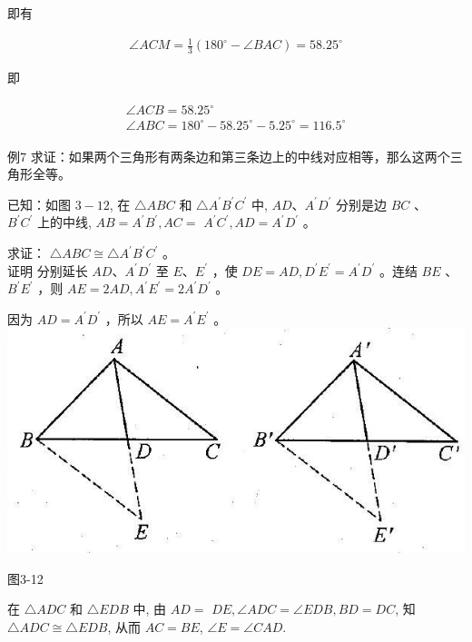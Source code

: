 \documentclass[10pt]{article}
\begin{document}
即有

\begin{align*}
\angle A C M=\frac{1}{3}\left(180^{\circ}-\angle B A C\right)=58.25^{\circ}
\end{align*}

即

\begin{align*}
\begin{gathered}
\angle A C B=58.25^{\circ} \\
\angle A B C=180^{\circ}-58.25^{\circ}-5.25^{\circ}=116.5^{\circ}
\end{gathered}
\end{align*}

例7 求证：如果两个三角形有两条边和第三条边上的中线对应相等，那么这两个三角形全等。

已知：如图 $3-12$, 在 $\triangle A B C$ 和 $\triangle A^{\prime} B^{\prime} C^{\prime}$ 中, $A D 、 A^{\prime} D^{\prime}$ 分别是边 $B C$ 、\\
$B^{\prime} C^{\prime}$ 上的中线, $A B=A^{\prime} B^{\prime}, A C=$ $A^{\prime} C^{\prime}, A D=A^{\prime} D^{\prime}$ 。

求证： $\triangle A B C \cong \triangle A^{\prime} B^{\prime} C^{\prime}$ 。\\
证明 分别延长 $A D 、 A^{\prime} D^{\prime}$ 至 $E 、 E^{\prime}$ ，使 $D E=A D, D^{\prime} E^{\prime}=A^{\prime} D^{\prime}$ 。连结 $B E$ 、 $B^{\prime} E^{\prime}$ ，则 $A E=2 A D, A^{\prime} E^{\prime}=2 A^{\prime} D^{\prime}$ 。

因为 $A D=A^{\prime} D^{\prime}$ ，所以 $A E=A^{\prime} E^{\prime}$ 。\\
\includegraphics[max width=\textwidth, center]{2024_10_30_2c8f45efd4a519b08e1ag-030}

图3-12

在 $\triangle A D C$ 和 $\triangle E D B$ 中, 由 $A D=$ $D E, \angle A D C=\angle E D B, B D=D C$, 知 $\triangle A D C \cong \triangle E D B$, 从而 $A C=B E$, $\angle E=\angle C A D$.
\end{document}
